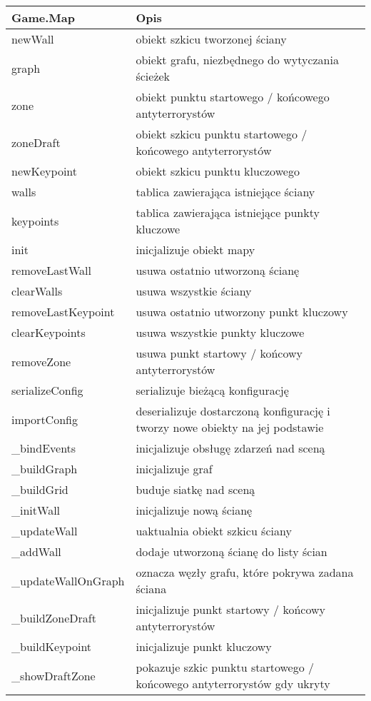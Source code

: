 \begin{table}
\begin{center}
\begin{tabular}{|p{}|p{}|}
\hline
\textbf{Game.Map} & Opis\\\hline		
	newWall & obiekt szkicu tworzonej ściany\\
	graph & obiekt grafu, niezbędnego do wytyczania ścieżek\\
	zone & obiekt punktu startowego / końcowego antyterrorystów\\
	zoneDraft & obiekt szkicu punktu startowego / końcowego antyterrorystów\\
	newKeypoint & obiekt szkicu punktu kluczowego\\
	walls & tablica zawierająca istniejące ściany\\
	keypoints & tablica zawierająca istniejące punkty kluczowe
\\\hline
	init & inicjalizuje obiekt mapy\\ 
	removeLastWall & usuwa ostatnio utworzoną ścianę\\
	clearWalls & usuwa wszystkie ściany\\
	removeLastKeypoint & usuwa ostatnio utworzony punkt kluczowy\\
	clearKeypoints & usuwa wszystkie punkty kluczowe\\
	removeZone & usuwa punkt startowy / końcowy antyterrorystów\\
	serializeConfig & serializuje bieżącą konfigurację\\
	importConfig & deserializuje dostarczoną konfigurację i tworzy nowe obiekty na jej podstawie\\
	\_bindEvents & inicjalizuje obsługę zdarzeń nad sceną\\
	\_buildGraph & inicjalizuje graf\\
	\_buildGrid & buduje siatkę nad sceną\\
	\_initWall & inicjalizuje nową ścianę\\
	\_updateWall & uaktualnia obiekt szkicu ściany\\
	\_addWall & dodaje utworzoną ścianę do listy ścian\\
	\_updateWallOnGraph & oznacza węzły grafu, które pokrywa zadana ściana\\
	\_buildZoneDraft & inicjalizuje punkt startowy / końcowy antyterrorystów\\
	\_buildKeypoint & inicjalizuje punkt kluczowy\\
	\_showDraftZone & pokazuje szkic punktu startowego / końcowego antyterrorystów gdy ukryty\\

\end{tabular}
\end{center}
\end{table}
